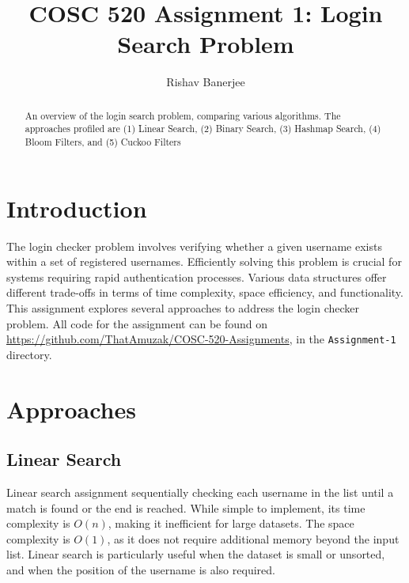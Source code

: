 \documentclass[acmsmall,screen, nonacm]{acmart}
\begin{document}
\title{COSC 520 Assignment 1: Login Search Problem}

\author{Rishav Banerjee}

\renewcommand{\shortauthors}{Banerjee}

\begin{abstract}
	An overview of the login search problem, comparing various algorithms.
	The approaches profiled are (1) Linear Search, (2) Binary Search, (3) Hashmap Search, (4) Bloom Filters, and (5) Cuckoo Filters
\end{abstract}

\maketitle

\section{Introduction}
The login checker problem involves verifying whether a given username exists within a set of registered usernames.
Efficiently solving this problem is crucial for systems requiring rapid authentication processes.
Various data structures offer different trade-offs in terms of time complexity, space efficiency, and functionality.
This assignment explores several approaches to address the login checker problem.
All code for the assignment can be found on \url{https://github.com/ThatAmuzak/COSC-520-Assignments}, in the \texttt{Assignment-1} directory.

\section{Approaches}

\subsection{Linear Search}
Linear search assignment sequentially checking each username in the list until a match is found or the end is reached.
While simple to implement, its time complexity is \(O(n)\), making it inefficient for large datasets.
The space complexity is \(O(1)\), as it does not require additional memory beyond the input list.
Linear search is particularly useful when the dataset is small or unsorted, and when the position of the username is also required.
\end{document}
